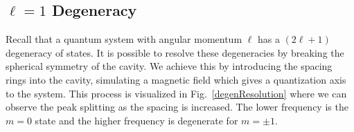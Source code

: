 \documentclass[12pt]{article}
\newcommand{\figref}[1]{Fig.\ \ref{#1}}
\begin{document}
		
		
		\subsection{$\ell=1$ Degeneracy}
		Recall that a quantum system with angular momentum $\ell$ has a $(2\ell+1)$ degeneracy of states. It is possible to resolve these degeneracies by breaking the spherical symmetry of the cavity. We achieve this by introducing the spacing rings into the cavity, simulating a magnetic field which gives a quantization axis to the system. This process is visualized in \figref{degenResolution} where we can observe the peak splitting as the spacing is increased. The lower frequency is the $m=0$ state and the higher frequency is degenerate for $m=\pm1$.
		
		
		
\end{document}
